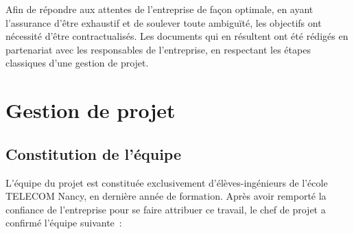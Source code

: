 Afin de répondre aux attentes de l'entreprise de façon optimale, en ayant l'assurance d'être exhaustif et de soulever toute ambiguïté, les objectifs ont nécessité d'être contractualisés. Les documents qui en résultent ont été rédigés en partenariat avec les responsables de l'entreprise, en respectant les étapes classiques d'une gestion de projet.

\section{Gestion de projet}
\subsection{Constitution de l'équipe}

L'équipe du projet est constituée exclusivement d'élèves-ingénieurs de l'école TELECOM Nancy, en dernière année de formation. Après avoir remporté la confiance de l'entreprise pour se faire attribuer ce travail, le chef de projet a confirmé l'équipe suivante~:

